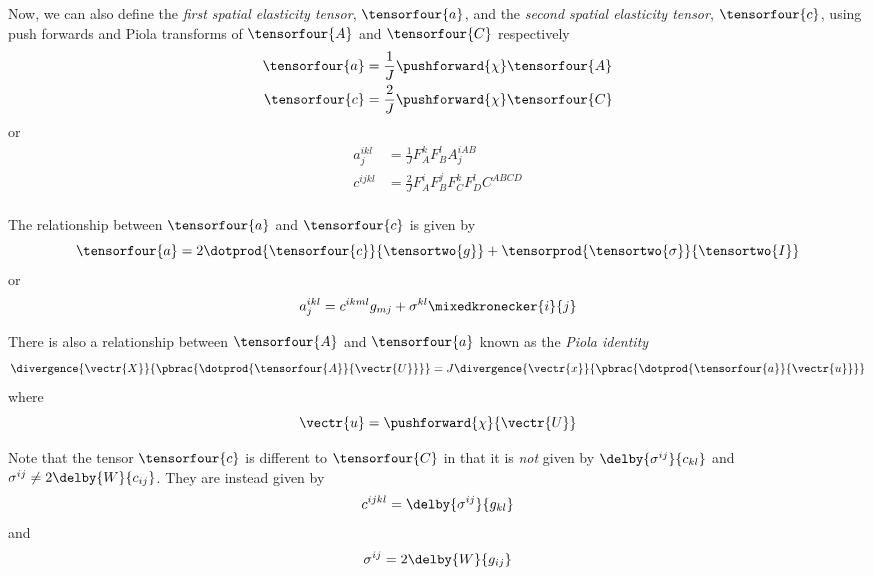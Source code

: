 Now, we can also define the \emph{first spatial elasticity tensor},
$\tensorfour{a}$, and the \emph{second spatial elasticity tensor},
$\tensorfour{c}$, using push forwards and Piola transforms of $\tensorfour{A}$
and $\tensorfour{C}$ respectively \ie
\begin{equation}
  \begin{split}
    \tensorfour{a}&=\frac{1}{J}\pushforward{\chi}\tensorfour{A} \\
    \tensorfour{c}&=\frac{2}{J}\pushforward{\chi}\tensorfour{C} \\
  \end{split}
\end{equation}
or
\begin{equation}
  \begin{split}
    a^{ikl}_{j}&=\frac{1}{J}F^{k}_{A}F^{l}_{B}A^{iAB}_{j} \\
    c^{ijkl}&=\frac{2}{J}F^{i}_{A}F^{j}_{B}F^{k}_{C}F^{l}_{D}C^{ABCD} \\
  \end{split}
\end{equation}

The relationship between $\tensorfour{a}$ and $\tensorfour{c}$ is given by
\begin{equation}
  \tensorfour{a}=2\dotprod{\tensorfour{c}}{\tensortwo{g}}+\tensorprod{\tensortwo{\sigma}}{\tensortwo{I}}
\end{equation}
or
\begin{equation}
  a^{ikl}_{j}=c^{ikml}g_{mj}+\sigma^{kl}\mixedkronecker{i}{j}
\end{equation}

There is also a relationship between $\tensorfour{A}$ and $\tensorfour{a}$
known as the \emph{Piola identity} \ie
\begin{equation}
  \divergence{\vectr{X}}{\pbrac{\dotprod{\tensorfour{A}}{\vectr{U}}}}=
  J\divergence{\vectr{x}}{\pbrac{\dotprod{\tensorfour{a}}{\vectr{u}}}}
\end{equation}
where
\begin{equation}
  \vectr{u}=\pushforward{\chi}{\vectr{U}}
\end{equation}

Note that the tensor $\tensorfour{c}$ is different to $\tensorfour{C}$ in that
it is \emph{not} given by $\delby{\sigma^{ij}}{c_{kl}}$ and $\sigma^{ij}\neq
2\delby{W}{c_{ij}}$. They are instead given by
\begin{equation}
  c^{ijkl}=\delby{\sigma^{ij}}{g_{kl}}
\end{equation}
and
\begin{equation}
  \sigma^{ij}=2\delby{W}{g_{ij}}
\end{equation}

